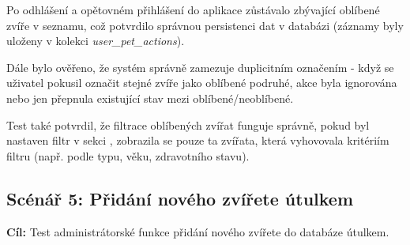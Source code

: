 \documentclass[czech, bp, kiv, he, iso690numb, pdf]{fasthesis}
\begin{document}
    Po odhlášení a opětovném přihlášení do aplikace zůstávalo zbývající oblíbené zvíře v seznamu, což potvrdilo správnou persistenci dat v databázi (záznamy byly uloženy v kolekci \textit{user\_pet\_actions}).

    Dále bylo ověřeno, že systém správně zamezuje duplicitním označením - když se uživatel pokusil označit stejné zvíře jako oblíbené podruhé, akce byla ignorována nebo jen přepnula existující stav mezi oblíbené/neoblíbené.

    Test také potvrdil, že filtrace oblíbených zvířat funguje správně, pokud byl nastaven filtr v sekci , zobrazila se pouze ta zvířata, která vyhovovala kritériím filtru (např. podle typu, věku, zdravotního stavu).


    \subsection*{Scénář 5: Přidání nového zvířete útulkem}

    \textbf{Cíl:} Test administrátorské funkce přidání nového zvířete do databáze útulkem.\\
\end{document}
